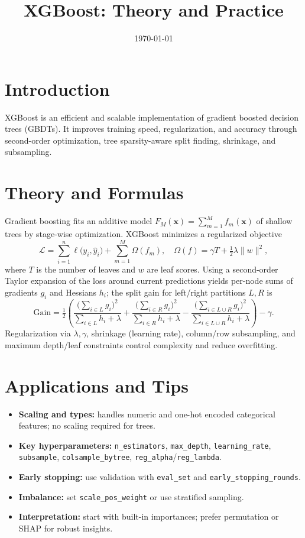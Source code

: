 \documentclass[11pt]{article}
\title{XGBoost: Theory and Practice}
\author{}
\date{\today}
\begin{document}
\maketitle

\section{Introduction}
XGBoost is an efficient and scalable implementation of gradient boosted decision trees (GBDTs). It improves training speed, regularization, and accuracy through second-order optimization, tree sparsity-aware split finding, shrinkage, and subsampling.

\section{Theory and Formulas}
Gradient boosting fits an additive model $F_M(\mathbf{x}) = \sum_{m=1}^M f_m(\mathbf{x})$ of shallow trees by stage-wise optimization. XGBoost minimizes a regularized objective
\begin{equation}
\mathcal{L} = \sum_{i=1}^n \ell\big(y_i, \hat{y}_i\big) + \sum_{m=1}^M \Omega(f_m), \quad \Omega(f) = \gamma T + \tfrac{1}{2}\lambda \lVert w \rVert^2,
\end{equation}
where $T$ is the number of leaves and $w$ are leaf scores. Using a second-order Taylor expansion of the loss around current predictions yields per-node sums of gradients $g_i$ and Hessians $h_i$; the split gain for left/right partitions $L,R$ is
\begin{equation}
\mathrm{Gain} = \tfrac{1}{2} \left( \frac{\big(\sum_{i\in L} g_i\big)^2}{\sum_{i\in L} h_i + \lambda} + \frac{\big(\sum_{i\in R} g_i\big)^2}{\sum_{i\in R} h_i + \lambda} - \frac{\big(\sum_{i\in L\cup R} g_i\big)^2}{\sum_{i\in L\cup R} h_i + \lambda} \right) - \gamma.
\end{equation}
Regularization via $\lambda,\gamma$, shrinkage (learning rate), column/row subsampling, and maximum depth/leaf constraints control complexity and reduce overfitting.

\section{Applications and Tips}
\begin{itemize}
  \item \textbf{Scaling and types:} handles numeric and one-hot encoded categorical features; no scaling required for trees.
  \item \textbf{Key hyperparameters:} \texttt{n\_estimators}, \texttt{max\_depth}, \texttt{learning\_rate}, \texttt{subsample}, \texttt{colsample\_bytree}, \texttt{reg\_alpha}/\texttt{reg\_lambda}.
  \item \textbf{Early stopping:} use validation with \texttt{eval\_set} and \texttt{early\_stopping\_rounds}.
  \item \textbf{Imbalance:} set \texttt{scale\_pos\_weight} or use stratified sampling.
  \item \textbf{Interpretation:} start with built-in importances; prefer permutation or SHAP for robust insights.
\end{itemize}
\end{document}
